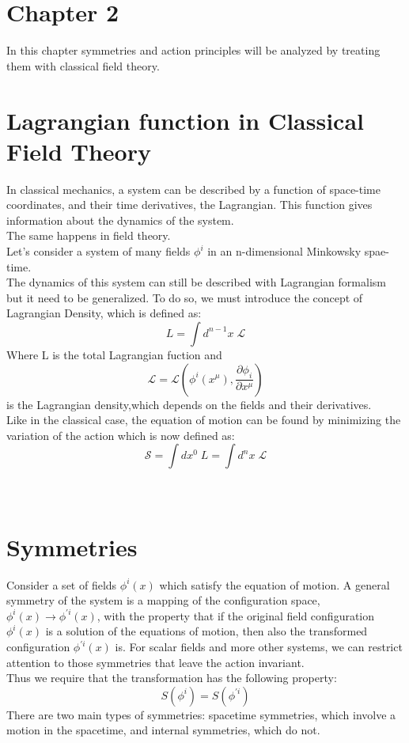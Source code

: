 \documentclass[a4paper,10pt]{article}
\date{11/4/2019}
\begin{document}
 \section*{Chapter 2}
 In this chapter symmetries and action principles will be analyzed by treating them with classical field theory.
 \section{Lagrangian function in Classical Field Theory}
 In classical mechanics, a system can be described by a function of space-time coordinates, and their time derivatives, the Lagrangian.
 This function gives information about the dynamics of the system.\\
 The same happens in field theory.\\
 Let's consider a system of many fields $\phi^i$ in an n-dimensional Minkowsky spae-time.\\
 The dynamics of this system can still be described with Lagrangian formalism but it need to be generalized.
 To do so, we must introduce the concept of Lagrangian Density, which is defined as:
 \begin{equation}
  L=\int{d^{n-1}x\;\mathcal{L} }
 \end{equation}
 Where L is the total Lagrangian fuction and 
 \begin{equation}
  \mathcal{L}= \mathcal{L} \left(\phi^i(x^\mu),\frac{\partial\phi_i}{\partial x^\mu} \right)
 \end{equation}
 is the Lagrangian density,which depends on the fields and their derivatives.\\
 Like in the classical case, the equation of motion can be found by minimizing the variation of the action which is now defined as:
 \begin{equation}
  \mathcal{S}=\int{dx^0\;L } = \int{d^nx\;\mathcal{L} }
 \end{equation}
 \\
 \\
 \section{Symmetries}
 Consider a set of fields $\phi^i(x)$ which satisfy the equation of motion.
 A general symmetry of the system is a mapping of the configuration space, $\phi^i(x)\rightarrow\phi^{'i}(x)$,
 with the property that if the original field configuration $\phi^i(x)$ is a solution of the equations
 of motion, then also the transformed configuration $\phi^{'i}(x)$ is. 
 For scalar fields and more other systems, we can restrict attention to those symmetries that leave the action invariant.\\
 Thus we require that the transformation has the following property:
 \begin{equation}
  S(\phi^i)=S(\phi^{'i})
 \end{equation}
 There are two main types of symmetries: spacetime symmetries, which involve a motion in the spacetime, and internal symmetries, which do not.
\end{document}
